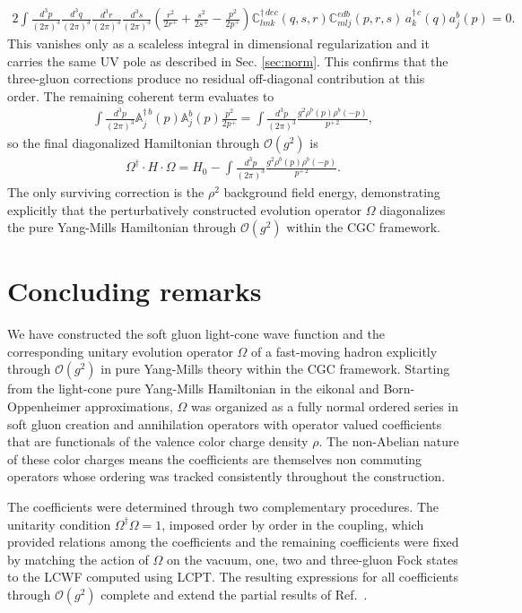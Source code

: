 \documentclass[a4paper,11pt]{article}
\def\mf#1{\mathbb{#1}}
\begin{document}
\begin{align}
     2\int\frac{d^{3}p}{(2\pi)^{3}}\frac{d^{3}q}{(2\pi)^{3}} \frac{d^{3}r}{(2\pi)^{3}}\frac{d^{3}s}{(2\pi)^{3}}\left(\frac{r^{2}}{2r^{+}}+\frac{s^{2}}{2s^{+}}-\frac{p^{2}}{2p^{+}}\right) \mf{C}^{\dagger\,dec}_{lmk}(q,s,r)\mf{C}^{edb}_{mlj}(p,r,s)\,a^{\dagger\, c}_{k}(q)a^{b}_{j}(p) = 0.
\end{align}
{\color{blue} This vanishes only as a scaleless integral in dimensional regularization and it carries the same UV pole as described in Sec. \ref{sec:norm}. } This confirms that the three-gluon corrections produce no residual off-diagonal contribution at this order. The remaining coherent term evaluates to
\begin{align}
    \int\frac{d^{3}p}{(2\pi)^{3}} \mf{A}^{\dagger\, b}_{j}(p)\mf{A}^{b}_{j}(p)\frac{p^{2}}{2p^{+}} = \int\frac{d^{3}p}{(2\pi)^{3}} \frac{g^{2}\rho^{b}(p)\rho^{b}(-p)}{p^{+\, 2}},
\end{align}
so the final diagonalized Hamiltonian through $\mathcal{O}(g^{2})$ is
\begin{align}\label{eq:final}
     \Omega^{\dagger}\cdot H \cdot \Omega  = H_{0} -\int \frac{d^{3}p}{(2\pi)^{3}} \frac{g^{2}\rho^{b}(p)\rho^{b}(-p)}{p^{+\, 2}}.
\end{align}
The only surviving correction is the $\rho^{2}$ background field energy, demonstrating explicitly that the perturbatively constructed evolution operator $\Omega$ diagonalizes the pure Yang-Mills Hamiltonian through $\mathcal{O}(g^{2})$ within the CGC framework.

\section{Concluding remarks}\label{sec:conclusion}
We have constructed the soft gluon light-cone wave function and the corresponding unitary evolution operator $\Omega$ of a fast-moving hadron explicitly through $\mathcal{O}(g^{2})$ in pure Yang-Mills theory within the CGC framework. Starting from the light-cone pure Yang-Mills Hamiltonian in the eikonal and Born-Oppenheimer approximations, $\Omega$ was organized as a fully normal ordered series in soft gluon creation and annihilation operators with operator valued coefficients that are functionals of the valence color charge density $\rho$. The non-Abelian nature of these color charges means the coefficients are themselves non commuting operators whose ordering was tracked consistently throughout the construction.

The coefficients were determined through two complementary procedures. The unitarity condition $\Omega^{\dagger}\Omega = 1$, imposed order by order in the coupling, which provided relations among the coefficients and the remaining coefficients were fixed by matching the action of $\Omega$ on the vacuum, one, two and three-gluon Fock states to the LCWF computed using LCPT. The resulting expressions for all coefficients through $\mathcal{O}(g^{2})$ complete and extend the partial results of Ref.~\cite{Lublinsky:2016meo}.
\end{document}
